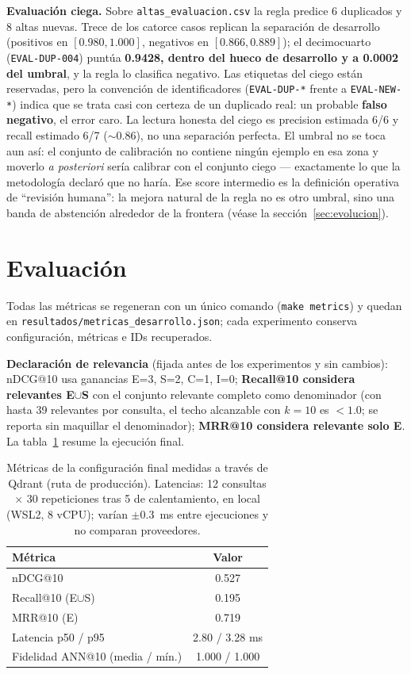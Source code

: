 \documentclass[10pt,twocolumn]{article}
\newcommand{\code}[1]{\texttt{\small #1}}
\begin{document}
\textbf{Evaluación ciega.} Sobre \code{altas\_evaluacion.csv} la regla
predice 6 duplicados y 8 altas nuevas. Trece de los catorce casos replican
la separación de desarrollo (positivos en $[0.980, 1.000]$, negativos en
$[0.866, 0.889]$); el decimocuarto (\code{EVAL-DUP-004}) puntúa
\textbf{0.9428, dentro del hueco de desarrollo y a 0.0002 del umbral}, y la
regla lo clasifica negativo. Las etiquetas del ciego están reservadas, pero
la convención de identificadores (\code{EVAL-DUP-*} frente a
\code{EVAL-NEW-*}) indica que se trata casi con certeza de un duplicado
real: un probable \textbf{falso negativo}, el error caro. La lectura
honesta del ciego es precision estimada 6/6 y recall estimado 6/7
(${\sim}0.86$), no una separación perfecta. El umbral no se toca aun así:
el conjunto de calibración no contiene ningún ejemplo en esa zona y moverlo
\emph{a posteriori} sería calibrar con el conjunto ciego --- exactamente lo
que la metodología declaró que no haría. Ese score intermedio es la
definición operativa de ``revisión humana'': la mejora natural de la regla
no es otro umbral, sino una banda de abstención alrededor de la frontera
(véase la sección~\ref{sec:evolucion}).

\section{Evaluación}
\label{sec:evaluacion}

Todas las métricas se regeneran con un único comando (\code{make metrics}) y
quedan en \code{resultados/metricas\_desarrollo.json}; cada experimento
conserva configuración, métricas e IDs recuperados.

\textbf{Declaración de relevancia} (fijada antes de los experimentos y sin
cambios): nDCG@10 \cite{jarvelin2002} usa ganancias E=3, S=2, C=1, I=0;
\textbf{Recall@10 considera relevantes E$\cup$S} con el conjunto relevante
completo como denominador (con hasta 39 relevantes por consulta, el techo
alcanzable con $k{=}10$ es $<1.0$; se reporta sin maquillar el denominador);
\textbf{MRR@10 considera relevante solo E}. La tabla~\ref{tab:metricas}
resume la ejecución final.

\begin{table}[h]
  \centering\small
  \caption{Métricas de la configuración final medidas a través de Qdrant
  (ruta de producción). Latencias: 12 consultas $\times$ 30 repeticiones
  tras 5 de calentamiento, en local (WSL2, 8 vCPU); varían $\pm 0.3$~ms
  entre ejecuciones y no comparan proveedores.}
  \label{tab:metricas}
  \begin{tabular}{@{}lc@{}}
    \toprule
    Métrica & Valor \\
    \midrule
    nDCG@10 & 0.527 \\
    Recall@10 (E$\cup$S) & 0.195 \\
    MRR@10 (E) & 0.719 \\
    Latencia p50 / p95 & 2.80 / 3.28 ms \\
    Fidelidad ANN@10 (media / mín.) & 1.000 / 1.000 \\
    \bottomrule
  \end{tabular}
\end{table}
\end{document}
